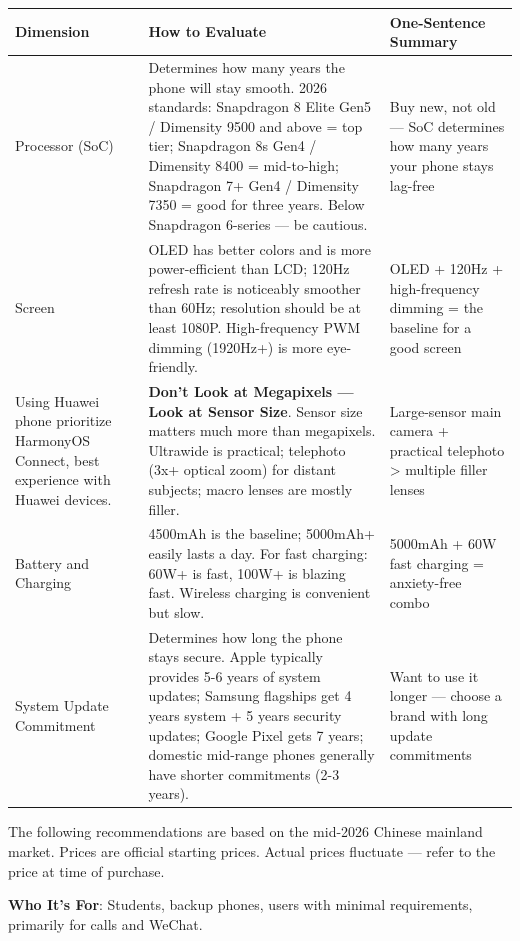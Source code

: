 \begin{center}
\begin{tabularx}{\linewidth}{|X|X|X|}
\hline
\textbf{Dimension} & \textbf{How to Evaluate} & \textbf{One-Sentence Summary} \tabularnewline
\hline
Processor (SoC) & Determines how many years the phone will stay smooth. 2026 standards: Snapdragon 8 Elite Gen5 / Dimensity 9500 and above = top tier; Snapdragon 8s Gen4 / Dimensity 8400 = mid-to-high; Snapdragon 7+ Gen4 / Dimensity 7350 = good for three years. Below Snapdragon 6-series — be cautious. & Buy new, not old — SoC determines how many years your phone stays lag-free \tabularnewline
Screen & OLED has better colors and is more power-efficient than LCD; 120Hz refresh rate is noticeably smoother than 60Hz; resolution should be at least 1080P. High-frequency PWM dimming (1920Hz+) is more eye-friendly. & OLED + 120Hz + high-frequency dimming = the baseline for a good screen \tabularnewline
Using Huawei phone prioritize HarmonyOS Connect, best experience with Huawei devices. & \textbf{Don't Look at Megapixels — Look at Sensor Size}. Sensor size matters much more than megapixels. Ultrawide is practical; telephoto (3x+ optical zoom) for distant subjects; macro lenses are mostly filler. & Large-sensor main camera + practical telephoto > multiple filler lenses \tabularnewline
Battery and Charging & 4500mAh is the baseline; 5000mAh+ easily lasts a day. For fast charging: 60W+ is fast, 100W+ is blazing fast. Wireless charging is convenient but slow. & 5000mAh + 60W fast charging = anxiety-free combo \tabularnewline
System Update Commitment & Determines how long the phone stays secure. Apple typically provides 5-6 years of system updates; Samsung flagships get 4 years system + 5 years security updates; Google Pixel gets 7 years; domestic mid-range phones generally have shorter commitments (2-3 years). & Want to use it longer — choose a brand with long update commitments \tabularnewline
\hline
\end{tabularx}
\end{center}


The following recommendations are based on the mid-2026 Chinese mainland market. Prices are official starting prices. Actual prices fluctuate — refer to the price at time of purchase.


\textbf{Who It's For}: Students, backup phones, users with minimal requirements, primarily for calls and WeChat.

